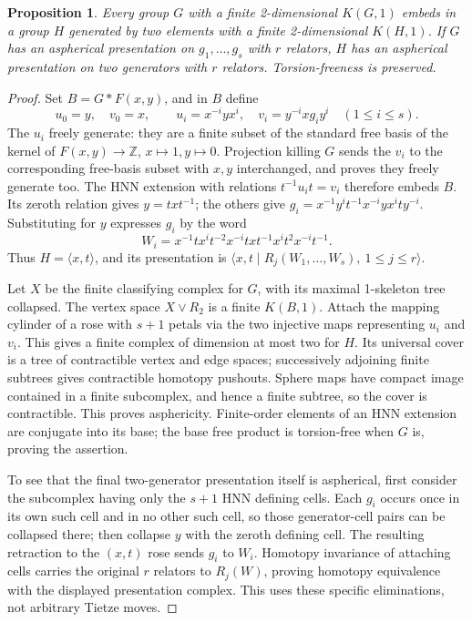 \documentclass[11pt]{article}
\newtheorem{proposition}[theorem]{Proposition}
\begin{document}
\begin{proposition}\label{prop:embedding}
Every group $G$ with a finite 2-dimensional $K(G,1)$ embeds in a group
$H$ generated by two elements with a finite 2-dimensional $K(H,1)$.
If $G$ has an aspherical presentation on $g_1,\ldots,g_s$ with $r$
relators, $H$ has an aspherical presentation on two generators with
$r$ relators. Torsion-freeness is preserved.
\end{proposition}
\begin{proof}
Set $B=G*F(x,y)$, and in $B$ define
\[
u_0=y,\quad v_0=x,\qquad
u_i=x^{-i}yx^i,\quad v_i=y^{-i}xg_i y^i\quad(1\le i\le s).
\]
The $u_i$ freely generate: they are a finite subset of the standard
free basis of the kernel of $F(x,y)\to\mathbb Z$, $x\mapsto1,y\mapsto0$.
Projection killing $G$ sends the $v_i$ to the corresponding free-basis
subset with $x,y$ interchanged, and proves they freely generate too.
The HNN extension with relations $t^{-1}u_it=v_i$ therefore embeds $B$.
Its zeroth relation gives $y=txt^{-1}$; the others give
$g_i=x^{-1}y^it^{-1}x^{-i}yx^ity^{-i}$. Substituting for $y$ expresses
$g_i$ by the word
\[
W_i=x^{-1}t x^i t^{-2}x^{-i}t x t^{-1}x^i t^2 x^{-i}t^{-1}.
\]
Thus $H=\langle x,t\rangle$, and its presentation is
$\langle x,t\mid R_j(W_1,\ldots,W_s),\ 1\le j\le r\rangle$.

Let $X$ be the finite classifying complex for $G$, with its maximal
1-skeleton tree collapsed. The vertex space $X\vee R_2$ is a finite
$K(B,1)$. Attach the mapping cylinder of a rose with $s+1$ petals via
the two injective maps representing $u_i$ and $v_i$. This gives a finite
complex of dimension at most two for $H$. Its universal cover is a
tree of contractible vertex and edge spaces; successively adjoining
finite subtrees gives contractible homotopy pushouts. Sphere maps have
compact image contained in a finite subcomplex, and hence a finite
subtree, so the cover is contractible. This proves asphericity.
Finite-order elements of an HNN extension are conjugate into its base;
the base free product is torsion-free when $G$ is, proving the assertion.

To see that the final two-generator presentation itself is aspherical,
first consider the subcomplex having only the $s+1$ HNN defining cells.
Each $g_i$ occurs once in its own such cell and in no other such cell,
so those generator-cell pairs can be collapsed there; then collapse
$y$ with the zeroth defining cell. The resulting retraction to the
$(x,t)$ rose sends $g_i$ to $W_i$. Homotopy invariance of attaching
cells carries the original $r$ relators to $R_j(W)$, proving homotopy
equivalence with the displayed presentation complex. This uses these
specific eliminations, not arbitrary Tietze moves.
\end{proof}
\end{document}
